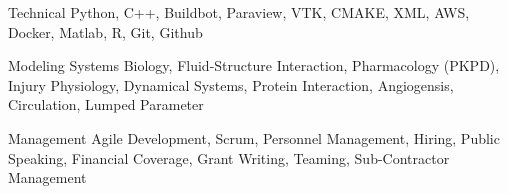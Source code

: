 
\begin{cvskills}
  \cvskill
    {Technical} %
    {Python, C++, Buildbot, Paraview, VTK, CMAKE, XML, AWS, Docker, Matlab, R, Git, Github} %

  \cvskill
    {Modeling} %
    {Systems Biology, Fluid-Structure Interaction, Pharmacology (PKPD), Injury Physiology, Dynamical Systems, Protein Interaction, Angiogensis, Circulation, Lumped Parameter} %

    \cvskill
    {Management} %
    {Agile Development, Scrum, Personnel Management, Hiring, Public Speaking, Financial Coverage, Grant Writing, Teaming, Sub-Contractor Management} %
\end{cvskills}
